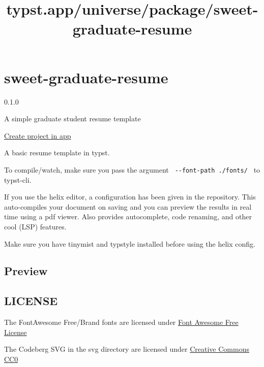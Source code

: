\title{typst.app/universe/package/sweet-graduate-resume}

\label{banner}
\label{template-thumbnail}

\section{sweet-graduate-resume}\label{sweet-graduate-resume}

{ 0.1.0 }

A simple graduate student resume template

\href{/app?template=sweet-graduate-resume&version=0.1.0}{Create project
in app}

\label{readme}
A basic resume template in typst.

To compile/watch, make sure you pass the argument
\texttt{\ -\/-font-path\ ./fonts/\ } to typst-cli.

If you use the helix editor, a configuration has been given in the
repository. This auto-compiles your document on saving and you can
preview the results in real time using a pdf viewer. Also provides
autocomplete, code renaming, and other cool (LSP) features.

Make sure you have tinymist and typstyle installed before using the
helix config.

\subsection{Preview}\label{preview}


\subsection{LICENSE}\label{license}

The FontAwesome Free/Brand fonts are licensed under
\href{https://github.com/FortAwesome/Font-Awesome?tab=License-1-ov-file}{Font
Awesome Free License}

The Codeberg SVG in the svg directory are licensed under
\href{https://codeberg.org/Codeberg/Design/src/commit/ac514aa9aaa2457d4af3c3e13df3ab136d22a49a/LICENSE}{Creative
Commons CC0}

